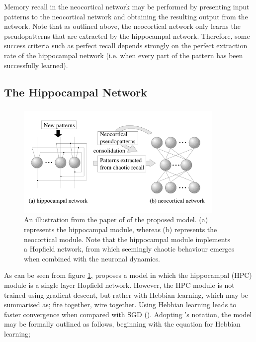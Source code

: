 Memory recall in the neocortical network may be performed by presenting input patterns to the neocortical network and obtaining the resulting output from the network. Note that as outlined above, the neocortical network only learns the pseudopatterns that are extracted by the hippocampal network. Therefore, some success criteria such as perfect recall depends strongly on the perfect extraction rate of the hippocampal network (i.e. when every part of the pattern has been successfully learned).

\subsection{The Hippocampal Network}
\subsubsection{\cite{Hattori2010}}
\begin{figure}
\centering
\includegraphics[width=10cm]{fig/hattori2010_model_structure}
\caption{An illustration from the paper of \cite{Hattori2010} of the proposed model. (a) represents the hippocampal module, whereas (b) represents the neocortical module. Note that the hippocampal module implements a Hopfield network, from which seemingly chaotic behaviour emerges when combined with the neuronal dynamics.}
\label{fig:hattori2010_model_structure}
\end{figure}

As can be seen from figure \ref{fig:hattori2010_model_structure}, \cite{Hattori2010} proposes a model in which the hippocampal (HPC) module is a single layer Hopfield network. However, the HPC module is not trained using gradient descent, but rather with Hebbian learning, which may be summarised as; fire together, wire together. Using Hebbian learning leads to faster convergence when compared with SGD (\cite{Hattori2010}). Adopting \cite{Hattori2010}'s notation, the model may be formally outlined as follows, beginning with the equation for Hebbian learning;

